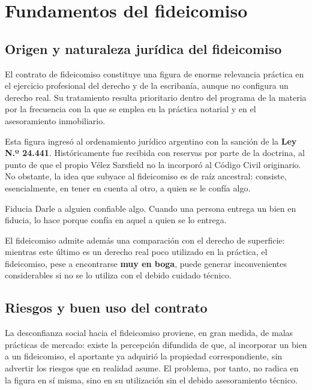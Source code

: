 \documentclass[12pt,oneside]{book}
\begin{document}
\chapter{Fundamentos del fideicomiso}

\section{Origen y naturaleza jurídica del fideicomiso}

El contrato de fideicomiso constituye una figura de enorme relevancia práctica en el ejercicio profesional del derecho y de la escribanía, aunque no configura un derecho real. Su tratamiento resulta prioritario dentro del programa de la materia por la frecuencia con la que se emplea en la práctica notarial y en el asesoramiento inmobiliario.

Esta figura ingresó al ordenamiento jurídico argentino con la sanción de la \textbf{Ley N.º 24.441}. Históricamente fue recibida con reservas por parte de la doctrina, al punto de que el propio Vélez Sarsfield no la incorporó al Código Civil originario. No obstante, la idea que subyace al fideicomiso es de raíz ancestral: consiste, esencialmente, en tener en cuenta al otro, a quien se le confía algo.

\begin{definition}{Fiducia}
Darle a alguien confiable algo. Cuando una persona entrega un bien en fiducia, lo hace porque confía en aquel a quien se lo entrega.
\end{definition}

El fideicomiso admite además una comparación con el derecho de superficie: mientras este último es un derecho real poco utilizado en la práctica, el fideicomiso, pese a encontrarse \textbf{muy en boga}, puede generar inconvenientes considerables si no se lo utiliza con el debido cuidado técnico.

\section{Riesgos y buen uso del contrato}

La desconfianza social hacia el fideicomiso proviene, en gran medida, de malas prácticas de mercado: existe la percepción difundida de que, al incorporar un bien a un fideicomiso, el aportante ya adquirió la propiedad correspondiente, sin advertir los riesgos que en realidad asume. El problema, por tanto, no radica en la figura en sí misma, sino en su utilización sin el debido asesoramiento técnico.
\end{document}
